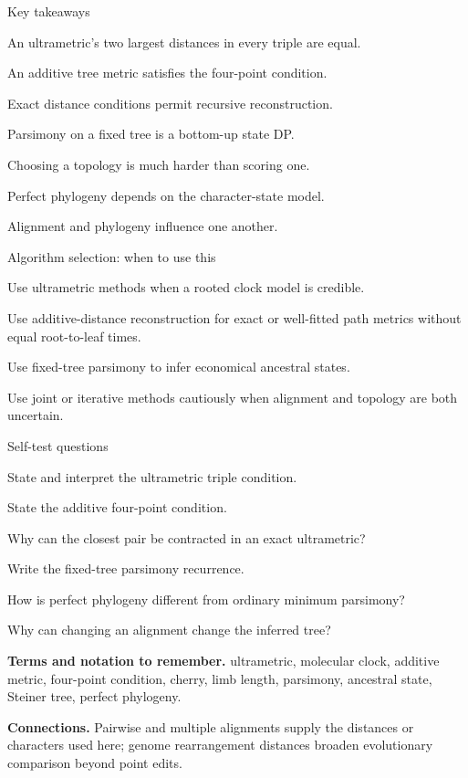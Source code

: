 \documentclass[11pt,letterpaper]{article}
\begin{document}
\begin{CornellSummaryBox}{Key takeaways}
\begin{CornellRecallList}
  \item An ultrametric's two largest distances in every triple are equal.
  \item An additive tree metric satisfies the four-point condition.
  \item Exact distance conditions permit recursive reconstruction.
  \item Parsimony on a fixed tree is a bottom-up state DP.
  \item Choosing a topology is much harder than scoring one.
  \item Perfect phylogeny depends on the character-state model.
  \item Alignment and phylogeny influence one another.
\end{CornellRecallList}
\end{CornellSummaryBox}

\begin{CornellOverviewBox}{Algorithm selection: when to use this}
\begin{CornellChecklist}
  \item Use ultrametric methods when a rooted clock model is credible.
  \item Use additive-distance reconstruction for exact or well-fitted path metrics without equal root-to-leaf times.
  \item Use fixed-tree parsimony to infer economical ancestral states.
  \item Use joint or iterative methods cautiously when alignment and topology are both uncertain.
\end{CornellChecklist}
\end{CornellOverviewBox}

\begin{CornellExamBox}{Self-test questions}
\begin{CornellRecallList}
  \item State and interpret the ultrametric triple condition.
  \item State the additive four-point condition.
  \item Why can the closest pair be contracted in an exact ultrametric?
  \item Write the fixed-tree parsimony recurrence.
  \item How is perfect phylogeny different from ordinary minimum parsimony?
  \item Why can changing an alignment change the inferred tree?
\end{CornellRecallList}
\end{CornellExamBox}

{\footnotesize
\textbf{Terms and notation to remember.} ultrametric, molecular clock, additive metric, four-point condition, cherry, limb length, parsimony, ancestral state, Steiner tree, perfect phylogeny.

\textbf{Connections.} Pairwise and multiple alignments supply the distances or characters used here; genome rearrangement distances broaden evolutionary comparison beyond point edits.
}
\end{document}
